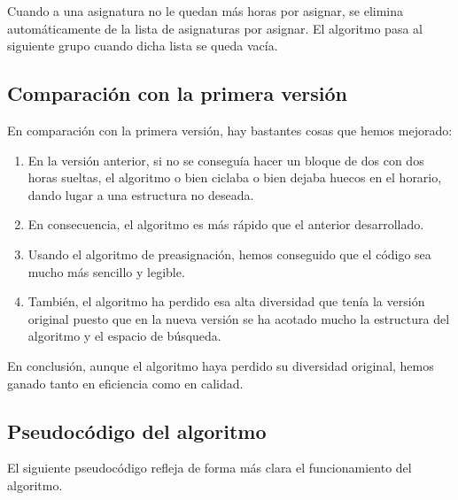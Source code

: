 Cuando a una asignatura no le quedan más horas por asignar, se elimina automáticamente de la lista de asignaturas por asignar. El algoritmo pasa al siguiente grupo cuando dicha lista se queda vacía.

\subsection{Comparación con la primera versión}
En comparación con la primera versión, hay bastantes cosas que hemos mejorado:

\begin{enumerate}[$\bullet$]
  \item En la versión anterior, si no se conseguía hacer un bloque de dos con dos horas sueltas, el algoritmo o bien ciclaba o bien dejaba huecos en el horario, dando lugar a una estructura no deseada.
  \item En consecuencia, el algoritmo es más rápido que el anterior desarrollado.
  \item Usando el algoritmo de preasignación, hemos conseguido que el código sea mucho más sencillo y legible.
  \item También, el algoritmo ha perdido esa alta diversidad que tenía la versión original puesto que en la nueva versión se ha acotado mucho la estructura del algoritmo y el espacio de búsqueda.
\end{enumerate}

En conclusión, aunque el algoritmo haya perdido su diversidad original, hemos ganado tanto en eficiencia como en calidad.

\subsection{Pseudocódigo del algoritmo}
El siguiente pseudocódigo refleja de forma más clara el funcionamiento del algoritmo.

